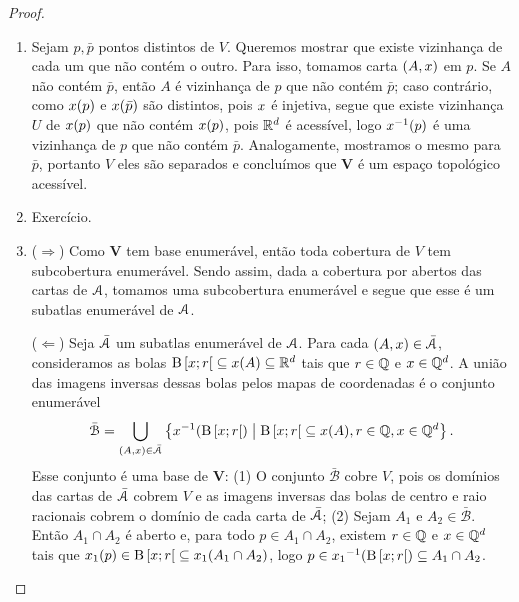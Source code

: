 \begin{proof}
	\begin{enumerate}
	\item Sejam $p,\bar p$ pontos distintos de $V$. Queremos mostrar que existe vizinhança de cada um que não contém o outro. Para isso, tomamos carta $(A,x)$ em $p$. Se $A$ não contém $\bar p$, então $A$ é vizinhança de $p$ que não contém $\bar p$; caso contrário, como $x(p)$ e $x(\bar p)$ são distintos, pois $x$ é injetiva, segue que existe vizinhança $U$ de $x(p)$ que não contém $x(p)$, pois $\mathbb{R}^d$ é acessível, logo $x^{-1}(p)$ é uma vizinhança de $p$ que não contém $\bar p$. Analogamente, mostramos o mesmo para $\bar p$, portanto $V$ eles são separados e concluímos que $\bm V$ é um espaço topológico acessível.
	
	\item Exercício.
	
	\item ($\Rightarrow$) Como $\bm V$ tem base enumerável, então toda cobertura de $V$ tem subcobertura enumerável. Sendo assim, dada a cobertura por abertos das cartas de $\mathcal{A}$, tomamos uma subcobertura enumerável e segue que esse é um subatlas enumerável de $\mathcal{A}$.

($\Leftarrow$) Seja $\bar {\mathcal{A}}$ um subatlas enumerável de $\mathcal{A}$. Para cada $(A,x) \in \bar {\mathcal{A}}$, consideramos as bolas $\mathrm{B}\left[{x};{r}\right[ \subseteq x(A) \subseteq \mathbb{R}^d$ tais que $r \in \mathbb{Q}$ e $x \in \mathbb{Q}^d$. A união das imagens inversas dessas bolas pelos mapas de coordenadas é o conjunto enumerável
	\begin{equation*}
	\bar{\mathcal B} = \bigcup_{(A,x) \in \bar {\mathcal{A}}} \left\{{x^{-1}(\mathrm{B}\left[{x};{r}\right[)}\;\middle\vert\;{\mathrm{B}\left[{x};{r}\right[ \subseteq x(A),  r \in \mathbb{Q}, x \in \mathbb{Q}^d}\right\}.
	\end{equation*}
Esse conjunto é uma base de $\bm V$: (1) O conjunto $\bar{\mathcal B}$ cobre $V$, pois os domínios das cartas de $\bar{\mathcal{A}}$ cobrem $V$ e as imagens inversas das bolas de centro e raio racionais cobrem o domínio de cada carta de $\bar{\mathcal{A}}$; (2) Sejam $A_1$ e $A_2 \in \bar{\mathcal B}$. Então $A_1 \cap A_2$ é aberto e, para todo $p \in A_1 \cap A_2$, existem $r \in \mathbb{Q}$ e $x \in \mathbb{Q}^d$ tais que $x_1(p) \in \mathrm{B}\left[{x};{r}\right[ \subseteq x_1(A_1 \cap A_2)$, logo $p \in {x_1}^{-1}(\mathrm{B}\left[{x};{r}\right[) \subseteq A_1 \cap A_2$.
	

\end{enumerate}
\end{proof}
